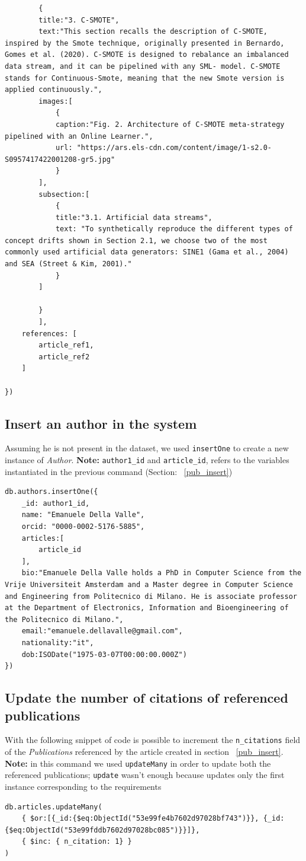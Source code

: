 \documentclass{Configuration_Files/PoliMi3i_thesis}
\begin{document}
\begin{lstlisting}
		{
		title:"3. C-SMOTE",
		text:"This section recalls the description of C-SMOTE, inspired by the Smote technique, originally presented in Bernardo, Gomes et al. (2020). C-SMOTE is designed to rebalance an imbalanced data stream, and it can be pipelined with any SML- model. C-SMOTE stands for Continuous-Smote, meaning that the new Smote version is applied continuously.",
		images:[
			{
			caption:"Fig. 2. Architecture of C-SMOTE meta-strategy pipelined with an Online Learner.",
			url: "https://ars.els-cdn.com/content/image/1-s2.0-S0957417422001208-gr5.jpg"
			}
		],
		subsection:[
			{
			title:"3.1. Artificial data streams",
			text: "To synthetically reproduce the different types of concept drifts shown in Section 2.1, we choose two of the most commonly used artificial data generators: SINE1 (Gama et al., 2004) and SEA (Street & Kim, 2001)."
			}
		]

		}
		],
	references: [
		article_ref1,
		article_ref2
	]

})
\end{lstlisting}


\subsection{Insert an author in the system}
Assuming he is not present in the dataset, we used \verb |insertOne| to create a new instance of \emph{Author}.\newline
\textbf{Note:} \verb |author1_id| and \verb|article_id|, refers to the variables instantiated in the previous
command (Section: ~\ref{pub_insert})
\begin{lstlisting}
db.authors.insertOne({
	_id: author1_id,
	name: "Emanuele Della Valle",
	orcid: "0000-0002-5176-5885",
	articles:[
		article_id
	],
	bio:"Emanuele Della Valle holds a PhD in Computer Science from the Vrije Universiteit Amsterdam and a Master degree in Computer Science and Engineering from Politecnico di Milano. He is associate professor at the Department of Electronics, Information and Bioengineering of the Politecnico di Milano.",
	email:"emanuele.dellavalle@gmail.com",
	nationality:"it",
	dob:ISODate("1975-03-07T00:00:00.000Z")
})
\end{lstlisting}

\subsection{Update the number of citations of referenced publications}
With the following snippet of code is possible to increment the \verb |n_citations| field of the \emph{Publications}
referenced by the article created in section ~\ref{pub_insert}.\newline
\textbf{Note:} in this command we used \verb |updateMany| in order to update both the referenced publications; \verb |update|
wasn't enough because updates only the first instance corresponding to the requirements
\begin{lstlisting}
db.articles.updateMany(
	{ $or:[{_id:{$eq:ObjectId("53e99fe4b7602d97028bf743")}}, {_id:{$eq:ObjectId("53e99fddb7602d97028bc085")}}]},
	{ $inc: { n_citation: 1} }
)
\end{lstlisting}
\end{document}

